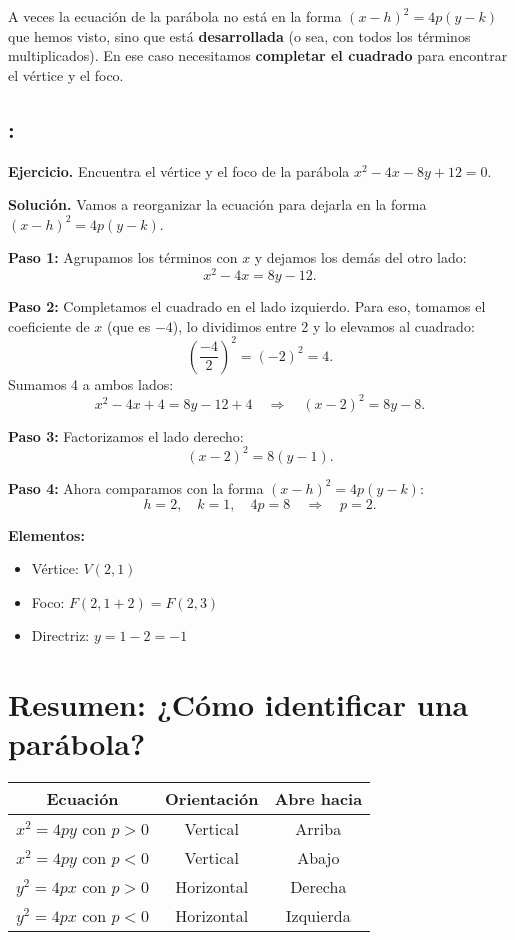 \documentclass[12pt,a4paper]{article}
\begin{document}
	A veces la ecuación de la parábola no está en la forma \((x-h)^2=4p(y-k)\) que hemos visto, sino que está \textbf{desarrollada} (o sea, con todos los términos multiplicados). En ese caso necesitamos \textbf{completar el cuadrado} para encontrar el vértice y el foco.

	\subsection*{{\color{blue!40!red}{Ejemplo 5}}: \color{blue!80!black}{Completar el cuadrado}}

	\textbf{Ejercicio.} Encuentra el vértice y el foco de la parábola \(x^2-4x-8y+12=0\).

	\bigskip

	\textbf{Solución.} Vamos a reorganizar la ecuación para dejarla en la forma \((x-h)^2=4p(y-k)\).

	\bigskip

	\textbf{Paso 1:} Agrupamos los términos con \(x\) y dejamos los demás del otro lado:
	\[
	x^2-4x=8y-12.
	\]

	\textbf{Paso 2:} Completamos el cuadrado en el lado izquierdo. Para eso, tomamos el coeficiente de \(x\) (que es \(-4\)), lo dividimos entre 2 y lo elevamos al cuadrado:
	\[
	\left(\frac{-4}{2}\right)^2=(-2)^2=4.
	\]
	Sumamos 4 a ambos lados:
	\[
	x^2-4x+4=8y-12+4 \quad\Rightarrow\quad (x-2)^2=8y-8.
	\]

	\textbf{Paso 3:} Factorizamos el lado derecho:
	\[
	(x-2)^2=8(y-1).
	\]

	\textbf{Paso 4:} Ahora comparamos con la forma \((x-h)^2=4p(y-k)\):
	\[
	h=2,\quad k=1,\quad 4p=8 \quad\Rightarrow\quad p=2.
	\]

	\bigskip

	\textbf{Elementos:}
	\begin{itemize}
		\item Vértice: \(V(2,1)\)
		\item Foco: \(F(2,1+2)=F(2,3)\)
		\item Directriz: \(y=1-2=-1\)
	\end{itemize}

	\section{Resumen: ¿Cómo identificar una parábola?}

	\begin{center}
		\begin{tabular}{|c|c|c|}
			\hline
			\textbf{Ecuación} & \textbf{Orientación} & \textbf{Abre hacia} \\
			\hline
			\(x^2=4py\) con \(p>0\) & Vertical & Arriba \\
			\hline
			\(x^2=4py\) con \(p<0\) & Vertical & Abajo \\
			\hline
			\(y^2=4px\) con \(p>0\) & Horizontal & Derecha \\
			\hline
			\(y^2=4px\) con \(p<0\) & Horizontal & Izquierda \\
			\hline
		\end{tabular}
	\end{center}
\end{document}

